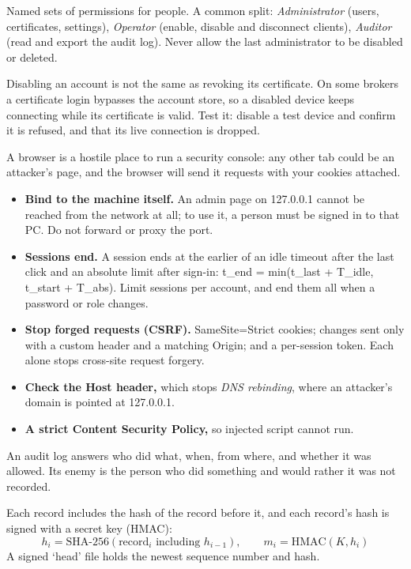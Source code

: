  Named sets of permissions for people. A common split: \emph{Administrator} (users, certificates, settings), \emph{Operator} (enable, disable and disconnect clients), \emph{Auditor} (read and export the audit log). Never allow the last administrator to be disabled or deleted.

\onsite Disabling an account is not the same as revoking its certificate. On some brokers a certificate login bypasses the account store, so a disabled device keeps connecting while its certificate is valid. Test it: disable a test device and confirm it is refused, and that its live connection is dropped.

A browser is a hostile place to run a security console: any other tab could be an attacker's page, and the browser will send it requests with your cookies attached.
\begin{itemize}
\item \textbf{Bind to the machine itself.} An admin page on 127.0.0.1 cannot be reached from the network at all; to use it, a person must be signed in to that PC. Do not forward or proxy the port.
\item \textbf{Sessions end.} A session ends at the earlier of an idle timeout after the last click and an absolute limit after sign-in: t\_end = min(t\_last + T\_idle, t\_start + T\_abs). Limit sessions per account, and end them all when a password or role changes.
\item \textbf{Stop forged requests (CSRF).} SameSite=Strict cookies; changes sent only with a custom header and a matching Origin; and a per-session token. Each alone stops cross-site request forgery.
\item \textbf{Check the Host header,} which stops \emph{DNS rebinding}, where an attacker's domain is pointed at 127.0.0.1.
\item \textbf{A strict Content Security Policy,} so injected script cannot run.
\end{itemize}

An audit log answers who did what, when, from where, and whether it was allowed. Its enemy is the person who did something and would rather it was not recorded.

 Each record includes the hash of the record before it, and each record's hash is signed with a secret key (HMAC):
\[ h_i = \text{SHA-256}(\text{record}_i \text{ including } h_{i-1}), \qquad m_i = \text{HMAC}(K, h_i) \]
A signed ‘head’ file holds the newest sequence number and hash.

